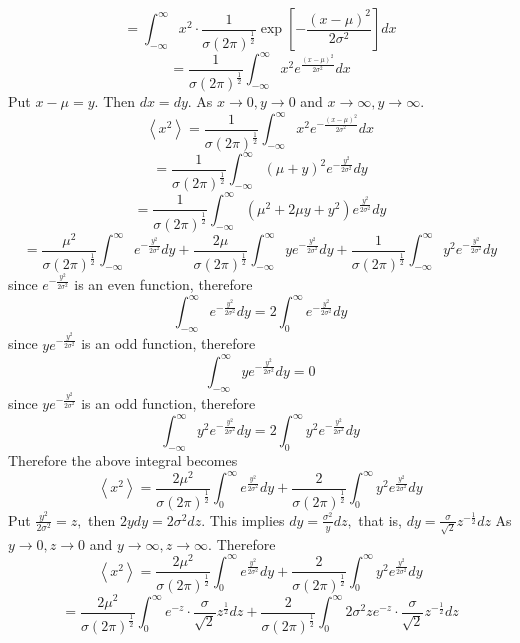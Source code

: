 \documentclass{article}
\begin{document}
\begin{flushleft}
$$$$
$$
=\int_{-\infty}^{\infty} x^{2} \cdot \frac{1}{\sigma(2 \pi)^{\frac{1}{2}}} \exp \left[-\frac{(x-\mu)^{2}}{2 \sigma^{2}}\right] d x
$$
$$
=\frac{1}{\sigma(2 \pi)^{\frac{1}{2}}} \int_{-\infty}^{\infty} x^{2} e^{\frac{(x-\mu)^{2}}{2 \sigma^{2}}} d x
$$
Put $x-\mu=y .$ Then $d x=d y .$ As $x \rightarrow 0, y \rightarrow 0$ and $x \rightarrow \infty, y \rightarrow \infty$.
$$
\left\langle x^{2}\right\rangle=\frac{1}{\sigma(2 \pi)^{\frac{1}{2}}} \int_{-\infty}^{\infty} x^{2} e^{-\frac{(x-\mu)^{2}}{2 \sigma^{2}}} d x
$$
$$
=\frac{1}{\sigma(2 \pi)^{\frac{1}{2}}} \int_{-\infty}^{\infty}(\mu+y)^{2} e^{-\frac{y^{2}}{2 \sigma^{2}}} d y
$$
$$
=\frac{1}{\sigma(2 \pi)^{\frac{1}{2}}} \int_{-\infty}^{\infty}\left(\mu^{2}+2 \mu y+y^{2}\right) e^{\frac{y^{2}}{2 \sigma^{2}}} d y
$$
$$
=\frac{\mu^{2}}{\sigma(2 \pi)^{\frac{1}{2}}} \int_{-\infty}^{\infty} e^{-\frac{y^{2}}{2 \sigma^{2}}} d y+\frac{2 \mu}{\sigma(2 \pi)^{\frac{1}{2}}} \int_{-\infty}^{\infty} y e^{-\frac{y^{2}}{2 \sigma^{2}}} d y+\frac{1}{\sigma(2 \pi)^{\frac{1}{2}}} \int_{-\infty}^{\infty} y^{2} e^{-\frac{y^{2}}{2 \sigma^{2}}} d y
$$
since $e^{-\frac{y^{2}}{2 \sigma^{2}}}$ is an even function, therefore
$$
\int_{-\infty}^{\infty} e^{-\frac{y^{2}}{2 \sigma^{2}}} d y=2 \int_{0}^{\infty} e^{-\frac{y^{2}}{2 \sigma^{2}}} d y
$$
since $y e^{-\frac{y^{2}}{2 \sigma^{2}}}$ is an odd function, therefore
$$
\int_{-\infty}^{\infty} y e^{-\frac{y^{2}}{2 \sigma^{2}}} d y=0
$$
since $y e^{-\frac{y^{2}}{2 \sigma^{2}}}$ is an odd function, therefore
$$
\int_{-\infty}^{\infty} y^{2} e^{-\frac{y^{2}}{2 \sigma^{2}}} d y=2 \int_{0}^{\infty} y^{2} e^{-\frac{y^{2}}{2 \sigma^{2}}} d y
$$
Therefore the above integral becomes
$$
\left\langle x^{2}\right\rangle=\frac{2 \mu^{2}}{\sigma(2 \pi)^{\frac{1}{2}}} \int_{0}^{\infty} e^{\frac{y^{2}}{2 \sigma^{2}}} d y+\frac{2}{\sigma(2 \pi)^{\frac{1}{2}}} \int_{0}^{\infty} y^{2} e^{\frac{y^{2}}{2 \sigma^{2}}} d y
$$
Put $\frac{y^{2}}{2 \sigma^{2}}=z,$ then $2 y d y=2 \sigma^{2} d z$. This implies $d y=\frac{\sigma^{2}}{y} d z,$ that is, $d y=\frac{\sigma}{\sqrt{2}} z^{-\frac{1}{2}} d z$
As $y \rightarrow 0, z \rightarrow 0$ and $y \rightarrow \infty, z \rightarrow \infty$. Therefore
$$\left\langle x^{2}\right\rangle=\frac{2 \mu^{2}}{\sigma(2 \pi)^{\frac{1}{2}}} \int_{0}^{\infty} e^{\frac{y^{2}}{2 \sigma^{2}}} d y+\frac{2}{\sigma(2 \pi)^{\frac{1}{2}}} \int_{0}^{\infty} y^{2} e^{\frac{y^{2}}{2 \sigma^{2}}} d y$$
$$=\frac{2 \mu^{2}}{\sigma(2 \pi)^{\frac{1}{2}}} \int_{0}^{\infty} e^{-z} \cdot \frac{\sigma}{\sqrt{2}} z^{\frac{1}{2}} d z+\frac{2}{\sigma(2 \pi)^{\frac{1}{2}}} \int_{0}^{\infty} 2 \sigma^{2} z e^{-z} \cdot \frac{\sigma}{\sqrt{2}} z^{-\frac{1}{2}} d z$$

\end{flushleft}
\end{document}
